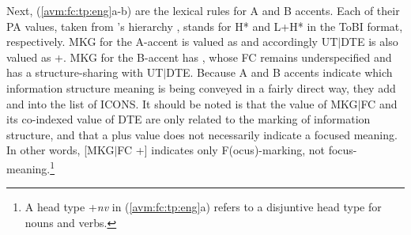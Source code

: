 



Next, (\ref{avm:fc:tp:eng}a-b) are the lexical rules for A and B
accents. Each of their PA values, taken from \citet{bildhauer:07}'s
hierarchy , stands for H* and L+H*
in the ToBI format, respectively. MKG for
the A-accent is valued as  and accordingly UT{$\mid$}DTE
is also valued as +. MKG for the B-accent has , whose FC
remains underspecified and has a structure-sharing with
UT{$\mid$}DTE. Because A and B accents indicate which information
structure meaning is being conveyed in a fairly direct way, they add
 and  into the list of
ICONS. It should be noted is that the value of MKG{$\mid$}FC and its
co-indexed value of DTE are only related to the marking of information
structure, and that a plus value does not necessarily indicate a
focused meaning. In other words, [MKG{$\mid$}FC +] indicates only
F(ocus)-marking, not focus-meaning.\footnote{A head type +{\it nv} in
  (\ref{avm:fc:tp:eng}a) refers to a disjuntive head type for nouns
  and verbs.}
 


